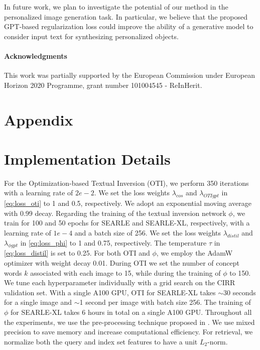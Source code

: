 \documentclass[10pt,twocolumn,letterpaper]{article}
\newcommand{\method}{SEARLE\xspace}
\begin{document}
In future work, we plan to investigate the potential of our method in the personalized image generation task. In particular, we believe that the proposed GPT-based regularization loss could improve the ability of a generative model to consider input text for synthesizing personalized objects.

\paragraph{Acknowledgments}
This work was partially supported by the European Commission under European Horizon 2020 Programme, grant number 101004545 - ReInHerit.

{\small


}


\clearpage
\appendix
\section*{Appendix}

\section{Implementation Details}
For the Optimization-based Textual Inversion (OTI), we perform 350 iterations with a learning rate of $2e\!-\!2$. We set the loss weights $\lambda_{cos}$ and $\lambda_{OTIgpt}$ in \cref{eq:loss_oti} to 1 and 0.5, respectively. We adopt an exponential moving average with 0.99 decay. Regarding the training of the textual inversion network $\phi$, we train for 100 and 50 epochs for \method and \method-XL, respectively, with a learning rate of $1e\!-\!4$ and a batch size of 256. We set the loss weights $\lambda_{distil}$ and $\lambda_{\phi gpt}$ in \cref{eq:loss_phi} to 1 and 0.75, respectively. The temperature $\tau$ in \cref{eq:loss_distil} is set to 0.25. For both OTI and $\phi$, we employ the AdamW optimizer \cite{loshchilov2018decoupled} with weight decay 0.01. 
During OTI we set the number of concept words $k$ associated with each image to 15, while during the training of $\phi$ to 150. We tune each hyperparameter individually with a grid search on the CIRR validation set.
With a single A100 GPU, OTI for \method-XL takes $\sim$30 seconds for a single image and $\sim$1 second per image with batch size 256. The training of $\phi$ for \method-XL takes 6 hours in total on a single A100 GPU. Throughout all the experiments, we use the pre-processing technique proposed in \cite{baldrati2022effective}. We use mixed precision to save memory and increase computational efficiency. For retrieval, we normalize both the query and index set features to have a unit $L_2$-norm.
\end{document}
